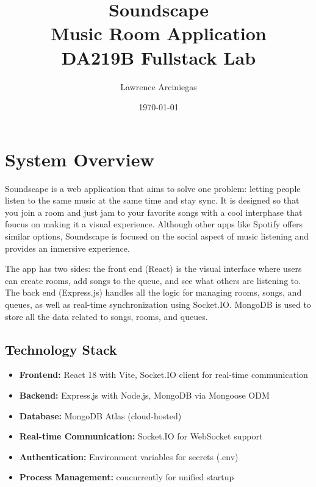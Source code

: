 \documentclass[11pt,a4paper]{article}
\title{\textbf{Soundscape} \\ Music Room Application \\ \large DA219B Fullstack Lab}
\author{Lawrence Arciniegas}
\date{\today}
\begin{document}
\maketitle

\tableofcontents
\newpage

\section{System Overview}

Soundscape is a web application that aims to solve one problem: letting people listen to the same music at the same time and stay sync. It is designed so that you join a room and just jam to your favorite songs with a cool interphase that foucus on making it a visual experience. Although other apps like Spotify offers similar options, Soundscape is focused on the social aspect of music listening and provides an inmersive experience.

The app has two sides: the front end (React) is the visual interface where users can create rooms, add songs to the queue, and see what others are listening to. The back end (Express.js) handles all the logic for managing rooms, songs, and queues, as well as real-time synchronization using Socket.IO. MongoDB is used to store all the data related to songs, rooms, and queues.
\subsection{Technology Stack}

\begin{itemize}
    \item \textbf{Frontend:} React 18 with Vite, Socket.IO client for real-time communication
    \item \textbf{Backend:} Express.js with Node.js, MongoDB via Mongoose ODM
    \item \textbf{Database:} MongoDB Atlas (cloud-hosted)
    \item \textbf{Real-time Communication:} Socket.IO for WebSocket support
    \item \textbf{Authentication:} Environment variables for secrets (.env)
    \item \textbf{Process Management:} concurrently for unified startup
\end{itemize}
\end{document}
